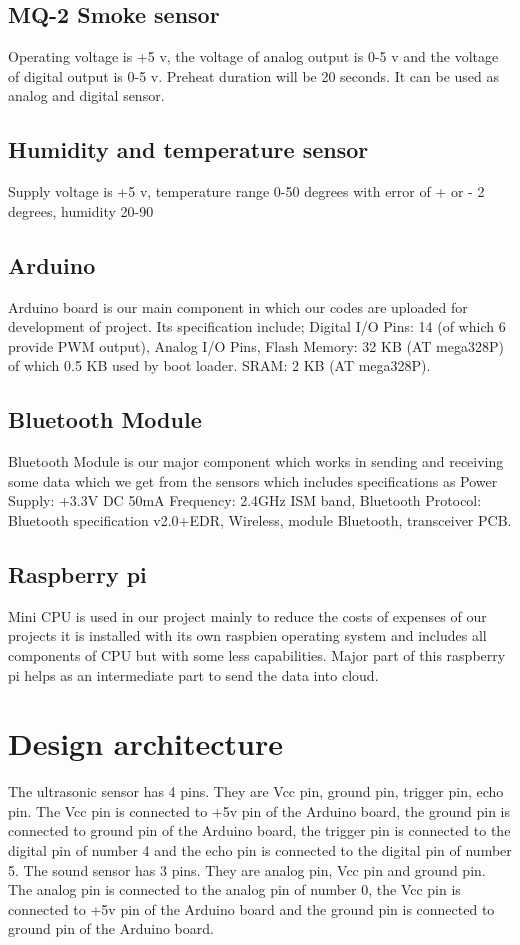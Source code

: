 \subsection{MQ-2 Smoke sensor }
Operating voltage is +5 v, the voltage of analog output is 0-5 v and the voltage of digital output is 0-5 v. Preheat duration will be 20 seconds. It can be used as analog and digital sensor.

\subsection{ Humidity and temperature sensor }
Supply voltage is +5 v, temperature range 0-50 degrees with error of + or - 2 degrees, humidity 20-90%

\subsection{Arduino}  Arduino board is our main component in which our codes are uploaded for development of project. Its specification include; Digital I/O Pins: 14 (of which 6 provide PWM output), Analog I/O Pins, Flash Memory: 32 KB (AT mega328P) of which 0.5 KB used by boot loader. SRAM: 2 KB (AT mega328P).

\subsection{Bluetooth Module} Bluetooth Module is our major component which works in sending and receiving some data which we get from the sensors which includes specifications as Power Supply: +3.3V DC 50mA Frequency: 2.4GHz ISM band, Bluetooth Protocol: Bluetooth specification v2.0+EDR, Wireless, module Bluetooth, transceiver PCB.

\subsection{Raspberry pi} Mini CPU is used in our project mainly to reduce the costs of expenses of our projects it is installed with its own raspbien operating system and includes all components of CPU but with some less capabilities. Major part of this raspberry pi helps as an intermediate part to send the data into cloud.

\section{Design architecture}
The ultrasonic sensor has 4 pins. They are Vcc pin, ground pin, trigger pin, echo pin. The Vcc pin is connected to +5v pin of the Arduino board, the ground pin is connected to ground pin of the Arduino board, the trigger pin is connected to the digital pin of number 4 and the echo pin is connected to the digital pin of number 5.
The sound sensor has 3 pins. They are analog pin, Vcc pin and ground pin. The analog pin is connected to the analog pin of number 0, the Vcc pin is connected to +5v pin of the Arduino board and the ground pin is connected to ground pin of the Arduino board.

